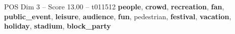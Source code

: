 \begin{textsample}{POS Dim 3 – Score 13.00 – t011512}  \label{ex:f3_pos_040}
\textbf{people}, \textbf{crowd}, \textbf{recreation}, \textbf{fan}, \textbf{public\_event}, \textbf{leisure}, \textbf{audience}, \textbf{fun}, pedestrian, \textbf{festival}, \textbf{vacation}, \textbf{holiday}, \textbf{stadium}, \textbf{block\_party}

\end{textsample}
